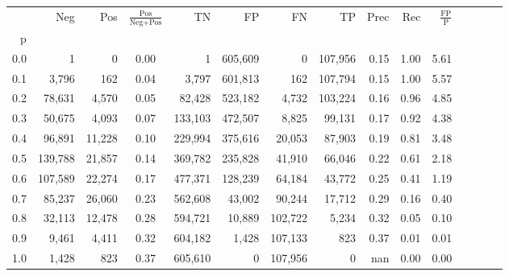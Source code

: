 \begin{tabular}{rrrcrrrrrrrrrrr}
\toprule
{} &      Neg &     Pos & $\frac{\text{Pos}}{\text{Neg}+\text{Pos}}$ &       TN &       FP &       FN &       TP &  Prec &   Rec & $\frac{\text{FP}}{\text{P}}$ \\
p   &          &         &                                            &          &          &          &          &       &       &                              \\
\midrule
0.0 &        1 &       0 &                                       0.00 &        1 &  605,609 &        0 &  107,956 &  0.15 &  1.00 &                         5.61 \\
0.1 &    3,796 &     162 &                                       0.04 &    3,797 &  601,813 &      162 &  107,794 &  0.15 &  1.00 &                         5.57 \\
0.2 &   78,631 &   4,570 &                                       0.05 &   82,428 &  523,182 &    4,732 &  103,224 &  0.16 &  0.96 &                         4.85 \\
0.3 &   50,675 &   4,093 &                                       0.07 &  133,103 &  472,507 &    8,825 &   99,131 &  0.17 &  0.92 &                         4.38 \\
0.4 &   96,891 &  11,228 &                                       0.10 &  229,994 &  375,616 &   20,053 &   87,903 &  0.19 &  0.81 &                         3.48 \\
0.5 &  139,788 &  21,857 &                                       0.14 &  369,782 &  235,828 &   41,910 &   66,046 &  0.22 &  0.61 &                         2.18 \\
0.6 &  107,589 &  22,274 &                                       0.17 &  477,371 &  128,239 &   64,184 &   43,772 &  0.25 &  0.41 &                         1.19 \\
0.7 &   85,237 &  26,060 &                                       0.23 &  562,608 &   43,002 &   90,244 &   17,712 &  0.29 &  0.16 &                         0.40 \\
0.8 &   32,113 &  12,478 &                                       0.28 &  594,721 &   10,889 &  102,722 &    5,234 &  0.32 &  0.05 &                         0.10 \\
0.9 &    9,461 &   4,411 &                                       0.32 &  604,182 &    1,428 &  107,133 &      823 &  0.37 &  0.01 &                         0.01 \\
1.0 &    1,428 &     823 &                                       0.37 &  605,610 &        0 &  107,956 &        0 &   nan &  0.00 &                         0.00 \\
\bottomrule
\end{tabular}
